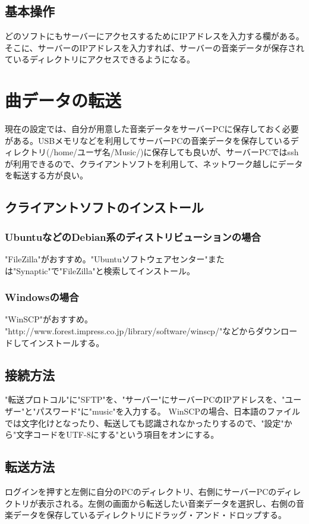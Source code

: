 \documentclass[11pt,a4paper]{jsarticle}
\begin{document}
\subsection{基本操作}
どのソフトにもサーバーにアクセスするためにIPアドレスを入力する欄がある。そこに、サーバーのIPアドレスを入力すれば、サーバーの音楽データが保存されているディレクトリにアクセスできるようになる。

\section{曲データの転送}
現在の設定では、自分が用意した音楽データをサーバーPCに保存しておく必要がある。USBメモリなどを利用してサーバーPCの音楽データを保存しているディレクトリ(/home/ユーザ名/Music/)に保存しても良いが、サーバーPCではsshが利用できるので、クライアントソフトを利用して、ネットワーク越しにデータを転送する方が良い。
\subsection{クライアントソフトのインストール}
\subsubsection{UbuntuなどのDebian系のディストリビューションの場合}
"FileZilla"がおすすめ。"Ubuntuソフトウェアセンター"または"Synaptic"で"FileZilla"と検索してインストール。
\subsubsection{Windowsの場合}
"WinSCP"がおすすめ。
"http://www.forest.impress.co.jp/library/software/winscp/"などからダウンロードしてインストールする。
\subsection{接続方法}
"転送プロトコル"に"SFTP"を、"サーバー"にサーバーPCのIPアドレスを、"ユーザー"と"パスワード"に"music"を入力する。
WinSCPの場合、日本語のファイルでは文字化けとなったり、転送しても認識されなかったりするので、"設定"から"文字コードをUTF-8にする"という項目をオンにする。
\subsection{転送方法}
ログインを押すと左側に自分のPCのディレクトリ、右側にサーバーPCのディレクトリが表示される。左側の画面から転送したい音楽データを選択し、右側の音楽データを保存しているディレクトリにドラッグ・アンド・ドロップする。
\end{document}

